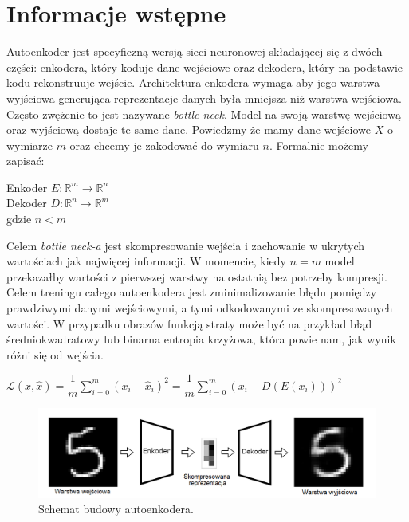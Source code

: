 \documentclass[a4paper,12pt]{book} %
\begin{document}
\section{Informacje wstępne}
Autoenkoder jest specyficzną wersją sieci neuronowej składającej się z dwóch części: enkodera, który koduje dane wejściowe oraz dekodera, który na podstawie kodu rekonstruuje wejście.\cite{bank2021autoencoders} Architektura enkodera wymaga aby jego warstwa wyjściowa generująca reprezentacje danych była mniejsza niż warstwa wejściowa. Często zwężenie to jest nazywane \textit{bottle neck}. Model na swoją warstwę wejściową oraz wyjściową dostaje te same dane. Powiedzmy że mamy dane wejściowe $X$ o wymiarze $m$ oraz chcemy je zakodować do wymiaru $n$. Formalnie możemy zapisać:\\
\begin{center}
	Enkoder $E: \mathbb{R}^m \rightarrow \mathbb{R}^n$\\
	Dekoder $D: \mathbb{R}^n \rightarrow \mathbb{R}^m$ \\
	gdzie $n < m$\\
\end{center}
Celem \textit{bottle neck-a} jest skompresowanie wejścia i zachowanie w ukrytych wartościach jak najwięcej informacji. W momencie, kiedy $n = m$ model przekazałby wartości z pierwszej warstwy na ostatnią bez potrzeby kompresji. Celem treningu całego autoenkodera jest zminimalizowanie błędu pomiędzy prawdziwymi danymi wejściowymi, a tymi odkodowanymi ze skompresowanych wartości. W przypadku obrazów funkcją straty może być na przykład błąd średniokwadratowy lub binarna entropia krzyżowa, która powie nam, jak wynik różni się od wejścia. 
 \begin{center}
 		$\mathcal{L}(x, \hat{x}) = \dfrac{1}{m}\displaystyle\sum_{i=0}^{m}(x_i-\hat{x}_i)^2 = \dfrac{1}{m}\displaystyle\sum_{i=0}^{m}(x_i-D(E(x_i)))^2$
 \end{center}

\begin{figure}[h]
	\centering\includegraphics[width=14.5cm]{pictures/autoencoder.png}
	\caption{Schemat budowy autoenkodera.}
\end{figure}
\newpage
\end{document}
